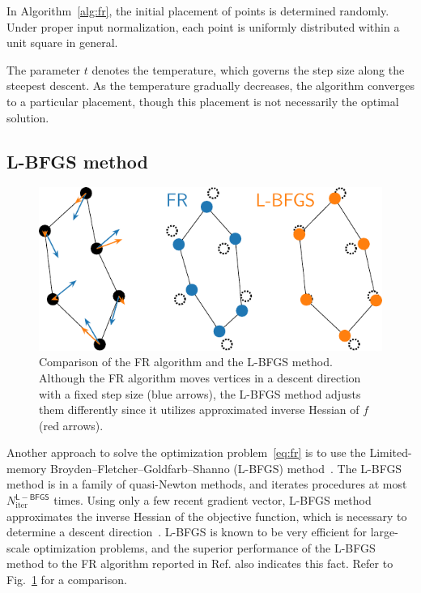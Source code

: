 \documentclass[dvipdfmx,journal]{IEEEtran}
\begin{document}
In Algorithm~\ref{alg:fr}, the initial placement of points is determined randomly. Under proper input normalization, each point is uniformly distributed within a unit square in general.

The parameter $t$ denotes the temperature, which governs the step size along the steepest descent. As the temperature gradually decreases, the algorithm converges to a particular placement, though this placement is not necessarily the optimal solution.

\subsection{L-BFGS method}\label{ssec:lbfgs}

\begin{figure}[t]
    \centering
    \includegraphics[width=0.713\columnwidth]{comparison/comparison_FRandLBFGS.pdf}
    \caption{
        Comparison of the FR algorithm and the L-BFGS method.
        Although the FR algorithm moves vertices in a descent direction with a fixed step size (blue arrows), the L-BFGS method adjusts them differently since it utilizes approximated inverse Hessian of $f$ (red arrows).
    }
    \label{fig:comparisonFRandLBFGS}
\end{figure}

Another approach to solve the optimization problem~\eqref{eq:fr} is to use the Limited-memory Broyden--Fletcher--Goldfarb--Shanno (L-BFGS) method~\cite{6183577}.
The L-BFGS method is in a family of quasi-Newton methods, and iterates procedures at most $N_\mathrm{iter}^{\mathsf{L-BFGS}}$ times.
Using only a few recent gradient vector, L-BFGS method approximates the inverse Hessian of the objective function, which is necessary to determine a descent direction~\cite{liuLimitedMemoryBFGS1989}.
L-BFGS is known to be very efficient for large-scale optimization problems, and the superior performance of the L-BFGS method to the FR algorithm reported in Ref.\cite{6183577} also indicates this fact. Refer to Fig.~\ref{fig:comparisonFRandLBFGS} for a comparison.
\end{document}
